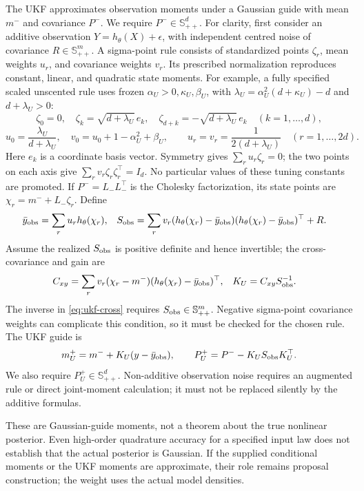 \documentclass[11pt,a4paper]{article}
\newcommand{\SPD}{\mathbb S_{++}}
\begin{document}
The UKF approximates observation moments under a Gaussian guide with mean
\(m^-\) and covariance \(P^-\). We require \(P^-\in\SPD^d\).
For clarity, first consider an additive observation
\(Y=h_\theta(X)+\epsilon\), with independent centred noise of covariance
\(R\in\SPD^m\). A sigma-point rule consists of standardized points
\(\zeta_r\), mean weights \(u_r\), and covariance weights \(v_r\).
Its prescribed normalization reproduces constant, linear, and quadratic
state moments. For example, a fully specified scaled unscented rule uses
frozen \(\alpha_U>0,\kappa_U,\beta_U\), with
\(\lambda_U=\alpha_U^2(d+\kappa_U)-d\) and \(d+\lambda_U>0\):
\[
 \zeta_0=0,\quad
 \zeta_k=\sqrt{d+\lambda_U}\,e_k,\quad
 \zeta_{d+k}=-\sqrt{d+\lambda_U}\,e_k
 \quad (k=1,\ldots,d),
\]
\[
 u_0=\frac{\lambda_U}{d+\lambda_U},\quad
 v_0=u_0+1-\alpha_U^2+\beta_U,\qquad
 u_r=v_r=\frac{1}{2(d+\lambda_U)}\quad(r=1,\ldots,2d).
\]
Here \(e_k\) is a coordinate basis vector. Symmetry gives
\(\sum_ru_r\zeta_r=0\); the two points on each axis give
\(\sum_rv_r\zeta_r\zeta_r^\top=I_d\).
No particular values of these tuning constants are promoted.
If \(P^-=L_-L_-^\top\) is the Cholesky factorization, its state
points are \(\chi_r=m^-+L_-\zeta_r\). Define
\begin{align}
\label{eq:ukf-observation}
 \bar y_{\rm obs}&=\sum_r u_r h_\theta(\chi_r),&
 S_{\rm obs}&=\sum_r v_r(h_\theta(\chi_r)-\bar y_{\rm obs})
                  (h_\theta(\chi_r)-\bar y_{\rm obs})^\top+R.
\end{align}
Assume the realized \(S_{\rm obs}\) is positive definite and hence
invertible; the cross-covariance and gain are
\begin{align}
\label{eq:ukf-cross}
 C_{xy}&=\sum_r v_r(\chi_r-m^-)
                  (h_\theta(\chi_r)-\bar y_{\rm obs})^\top,&
 K_U&=C_{xy}S_{\rm obs}^{-1}.
\end{align}
The inverse in \eqref{eq:ukf-cross} requires \(S_{\rm obs}\in\SPD^m\).
Negative sigma-point covariance weights can complicate this condition, so it
must be checked for the chosen rule. The UKF guide is
\begin{equation}
\label{eq:ukf-update}
 m_U^+=m^-+K_U(y-\bar y_{\rm obs}),\qquad
 P_U^+=P^- - K_US_{\rm obs}K_U^\top.
\end{equation}
We also require \(P_U^+\in\SPD^d\). Non-additive observation noise requires
an augmented rule or direct joint-moment calculation; it must not be
replaced silently by the additive formulas.

These are Gaussian-guide moments, not a theorem about the true nonlinear
posterior. Even high-order quadrature accuracy for a specified input law
does not establish that the actual posterior is Gaussian. If the supplied
conditional moments or the UKF moments are approximate, their role remains
proposal construction; the weight uses the actual model densities.
\end{document}
